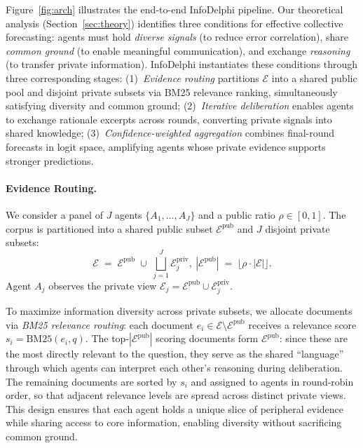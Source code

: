 \documentclass[11pt]{article}
\theoremstyle{plain}
\theoremstyle{definition}
\newcommand{\Epub}{\mathcal{E}^{\mathrm{pub}}}
\newcommand{\Epriv}[1]{\mathcal{E}_{#1}^{\mathrm{priv}}}
\newcommand{\Eview}[1]{\mathcal{E}_{#1}}
\begin{document}
Figure~\ref{fig:arch} illustrates the end-to-end InfoDelphi pipeline.
Our theoretical analysis (Section~\ref{sec:theory}) identifies three conditions for effective collective forecasting: agents must hold \textit{diverse signals} (to reduce error correlation), share \textit{common ground} (to enable meaningful communication), and exchange \textit{reasoning} (to transfer private information).
InfoDelphi instantiates these conditions through three corresponding stages:
(1)~\textit{Evidence routing} partitions $\mathcal{E}$ into a shared public pool and disjoint private subsets via BM25 relevance ranking, simultaneously satisfying diversity and common ground;
(2)~\textit{Iterative deliberation} enables agents to exchange rationale excerpts across rounds, converting private signals into shared knowledge;
(3)~\textit{Confidence-weighted aggregation} combines final-round forecasts in logit space, amplifying agents whose private evidence supports stronger predictions.

\paragraph{Evidence Routing.}
\label{sec:routing}

We consider a panel of $J$ agents $\{A_1, \dots, A_J\}$ and a public ratio $\rho \in [0,1]$.
The corpus is partitioned into a shared public subset $\Epub$ and $J$ disjoint private subsets:
\begin{equation}
  \mathcal{E} \;=\; \Epub \;\cup\; \bigsqcup_{j=1}^{J} \Epriv{j},
  \ |\Epub| \;=\; \lfloor \rho \cdot |\mathcal{E}| \rfloor.
  \label{eq:partition}
\end{equation}
Agent $A_j$ observes the private view $\Eview{j} = \Epub \cup \Epriv{j}$.

To maximize information diversity across private subsets, we allocate documents via \textit{BM25 relevance routing}: each document $e_i \in \mathcal{E} \setminus \Epub$ receives a relevance score $s_i = \mathrm{BM25}(e_i, q)$.
The top-$|\Epub|$ scoring documents form $\Epub$: since these are the most directly relevant to the question, they serve as the shared ``language'' through which agents can interpret each other's reasoning during deliberation.
The remaining documents are sorted by $s_i$ and assigned to agents in round-robin order, so that adjacent relevance levels are spread across distinct private views.
This design ensures that each agent holds a unique slice of peripheral evidence while sharing access to core information, enabling diversity without sacrificing common ground.
\end{document}
